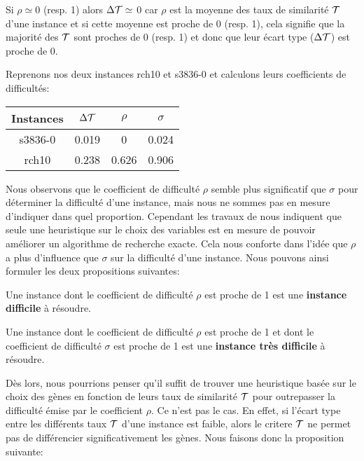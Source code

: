 \begin{remarque}
	Si $\rho \simeq 0$ (resp. 1) alors $\Delta\cal{T} \simeq $ 0 car $\rho$ est la moyenne des taux de similarité $\cal{T}$ d'une instance et si cette moyenne est proche de 0 (resp. 1), cela signifie que la majorité des $\cal{T}$ sont proches de 0 (resp. 1) et donc que leur écart type ($\Delta\cal{T}$) est proche de 0.
	\label{remDeltaTau}
\end{remarque}


Reprenons nos deux instances rch10 et s3836-0 et calculons leurs coefficients de difficultés:

\begin{center}
\begin{tabular}{|c|c|c|c|}
\hline 
Instances & $\Delta\cal{T} $ & $\rho$ & $\sigma$ \\ 
\hline 
s3836-0 & 0.019 & 0 & 0.024 \\ 
\hline
rch10 & 0.238 & 0.626 & 0.906 \\ 
\hline
\end{tabular} 
\end{center}

Nous observons que le coefficient de difficulté $\rho$ semble plus significatif que $\sigma$ pour déterminer la difficulté d'une instance, mais nous ne sommes pas en mesure d'indiquer dans quel proportion. Cependant les travaux de \cite{Chhel2013} nous indiquent que seule une heuristique sur le choix des variables est en mesure de pouvoir améliorer un algorithme de recherche exacte. Cela nous conforte dans l'idée que $\rho$ a plus d'influence que $\sigma$ sur la difficulté d'une instance. Nous pouvons ainsi formuler les deux propositions suivantes:

\begin{proposition}
Une instance dont le coefficient de difficulté $\rho$ est proche de 1 est une \textbf{instance difficile} à résoudre.
\end{proposition}

\begin{proposition}
Une instance dont le coefficient de difficulté $\rho$ est proche de 1 et dont le coefficient de difficulté $\sigma$ est proche de 1 est une \textbf{instance très difficile} à résoudre.
\end{proposition}

Dès lors, nous pourrions penser qu'il suffit de trouver une heuristique basée sur le choix des gènes en fonction de leurs taux de similarité $\cal{T}$ pour outrepasser la difficulté émise par le coefficient $\rho$. Ce n'est pas le cas. En effet, si l'écart type entre les différents taux $\cal{T}$ d'une instance est faible, alors le critere $\cal{T}$ ne permet pas de différencier significativement les gènes. Nous faisons donc la proposition suivante: 

